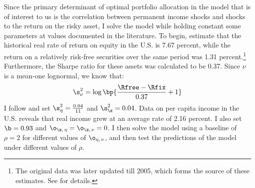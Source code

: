 Since the primary determinant of optimal portfolio allocation in the model that is of interest to us is the correlation between permanent income shocks and shocks to the return on the risky asset, I solve the model while holding constant some parameters at values documented in the literature. To begin, \citet{Mehra1985} estimate that the historical real rate of return on equity in the U.S. is 7.67 percent, while the return on a relatively risk-free securities over the same period was 1.31 percent.\footnote{The original data was later updated till 2005, which forms the source of these estimates. See \citet{Mehra2006} for details.} Furthermore, the Sharpe ratio for these assets was calculated to be 0.37. Since $\nu$ is a mean-one lognormal, we know that:
\[
\s_{\nu}^2 = \log\bp{\frac{\Rfree - \Rfix}{0.37} + 1}
\]
I follow \citet{Carroll2015} and set $\s_{\eta}^2 = \frac{0.04}{11}$ and $\s_{\z}^2 = 0.04$. Data on per capita income in the U.S. reveals that real income grew at an average rate of 2.16 percent. I also set $\b = 0.93$ and $\o_{\z,\,\eta} = \o_{\z,\,\nu} = 0$. I then solve the model using a baseline of $\rho = 2$ for different values of $\o_{\eta,\,\nu}$, and then test the predictions of the model under different values of $\rho$.


